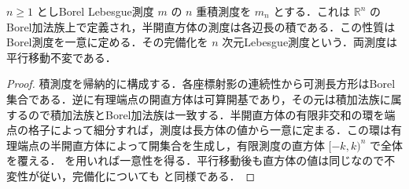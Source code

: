 \begin{prop}[Euclid空間上のLebesgue測度]
$n\geq1$ としBorel Lebesgue測度 $m$ の $n$ 重積測度を $m_n$ とする．これは $\mathbb R^n$ のBorel加法族上で定義され，半開直方体の測度は各辺長の積である．この性質はBorel測度を一意に定める．その完備化を $n$ 次元Lebesgue測度という．両測度は平行移動不変である．
\end{prop}
\begin{proof}
積測度を帰納的に構成する．各座標射影の連続性から可測長方形はBorel集合である．逆に有理端点の開直方体は可算開基であり，その元は積加法族に属するので積加法族とBorel加法族は一致する．半開直方体の有限非交和の環を端点の格子によって細分すれば，測度は長方体の値から一意に定まる．この環は有理端点の半開直方体によって開集合を生成し，有限測度の直方体 $[-k,k)^n$ で全体を覆える． を用いれば一意性を得る．平行移動後も直方体の値は同じなので不変性が従い，完備化についても  と同様である．
\end{proof}
